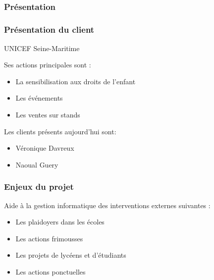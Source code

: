 \subsection{} %

\speaker{\Melissa}
\begin{frame}
\frametitle{Présentation}
	\frametitle{Présentation du client}
	\begin{center}
		UNICEF Seine-Maritime
	\end{center}

	Ses actions principales sont : 
	\begin{itemize}
		\item La sensibilisation aux droits de l'enfant
		\item Les événements 
		\item Les ventes sur stands
	\end{itemize}
		Les clients présents aujourd'hui sont: 
	\begin{itemize}
		\item Véronique Davreux
		\item Naoual Guery
	\end{itemize}
	
\end{frame}

\begin{frame}
\frametitle{Enjeux du projet}
Aide à la gestion informatique des interventions externes suivantes :
	\begin{itemize}
		\item Les plaidoyers dans les \'ecoles
		\item Les actions frimousses
		\item Les projets de lycéens et d'étudiants
		\item Les actions ponctuelles
	\end{itemize}
\end{frame}
